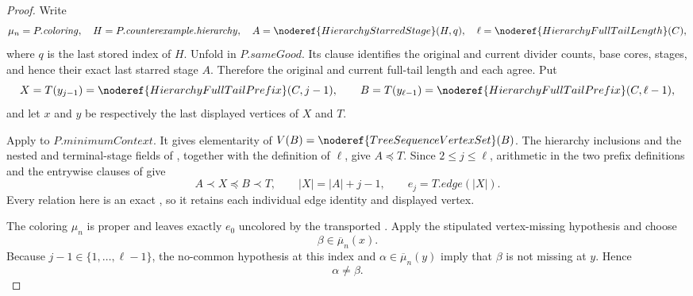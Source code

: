 \begin{proof}
Write
\[
 \mu_n=P.\mathit{coloring},\quad
 H=P.\mathit{counterexample}.\mathit{hierarchy},\quad
 A=\noderef{HierarchyStarredStage}(H,q),\quad
 \ell=\noderef{HierarchyFullTailLength}(C),
\]
where \(q\) is the last stored index of \(H\).  Unfold
 in \(P.\mathit{sameGood}\).  Its
 clause identifies the original and current
divider counts, base cores, stages, and hence their exact last starred
stage \(A\).  Therefore the original and current full-tail length and
each  agree.  Put
\[
 X=T(y_{j-1})=\noderef{HierarchyFullTailPrefix}(C,j-1),\qquad
 B=T(y_{\ell-1})=\noderef{HierarchyFullTailPrefix}(C,\ell-1),
\]
and let \(x\) and \(y\) be respectively the last displayed vertices of
\(X\) and \(T\).

Apply  to
\(P.\mathit{minimumContext}\).  It gives elementarity of
\(V(B)=\noderef{TreeSequenceVertexSet}(B)\).  The hierarchy inclusions and
the nested and terminal-stage fields of ,
together with the definition of \(\ell\), give \(A\preccurlyeq T\).  Since
\(2\le j\le\ell\), arithmetic in the two prefix definitions and the
entrywise clauses of  give
\[
 A\prec X\preccurlyeq B\prec T,\qquad
 |X|=|A|+j-1,\qquad e_j=T.\mathit{edge}(|X|).                \tag{1}
\]
Every relation here is an exact
, so it retains each individual edge
identity and displayed vertex.

The coloring \(\mu_n\) is proper and leaves exactly \(e_0\) uncolored by
the transported .  Apply
the stipulated vertex-missing hypothesis and choose
\[
                         \beta\in\overline\mu_n(x).           \tag{2}
\]
Because \(j-1\in\{1,\ldots,\ell-1\}\), the no-common hypothesis at this
index and \(\alpha\in\overline\mu_n(y)\) imply that \(\beta\) is not
missing at \(y\).  Hence
\[
                              \alpha\ne\beta.                \tag{3}
\]


\end{proof}
